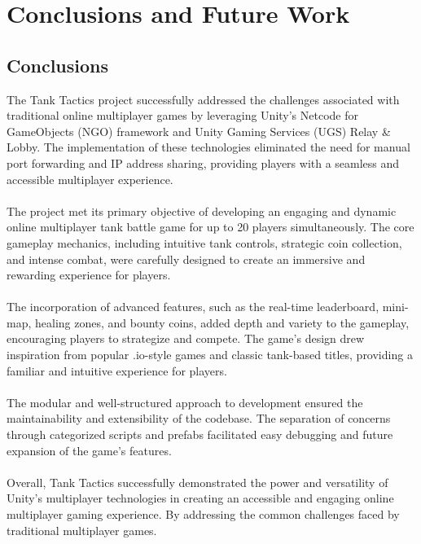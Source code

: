 \chapter{Conclusions and Future Work}
\label{ch:con}
\section{Conclusions}
The Tank Tactics project successfully addressed the challenges associated with traditional online multiplayer games by leveraging Unity's Netcode for GameObjects (NGO) framework and Unity Gaming Services (UGS) Relay \& Lobby. The implementation of these technologies eliminated the need for manual port forwarding and IP address sharing, providing players with a seamless and accessible multiplayer experience.
\\
\noindent
\\
The project met its primary objective of developing an engaging and dynamic online multiplayer tank battle game for up to 20 players simultaneously. The core gameplay mechanics, including intuitive tank controls, strategic coin collection, and intense combat, were carefully designed to create an immersive and rewarding experience for players.
\\
\noindent
\\
The incorporation of advanced features, such as the real-time leaderboard, mini-map, healing zones, and bounty coins, added depth and variety to the gameplay, encouraging players to strategize and compete. The game's design drew inspiration from popular .io-style games and classic tank-based titles, providing a familiar and intuitive experience for players.
\\
\noindent
\\
The modular and well-structured approach to development ensured the maintainability and extensibility of the codebase. The separation of concerns through categorized scripts and prefabs facilitated easy debugging and future expansion of the game's features.
\\
\noindent
\\
Overall, Tank Tactics successfully demonstrated the power and versatility of Unity's multiplayer technologies in creating an accessible and engaging online multiplayer gaming experience. By addressing the common challenges faced by traditional multiplayer games.


